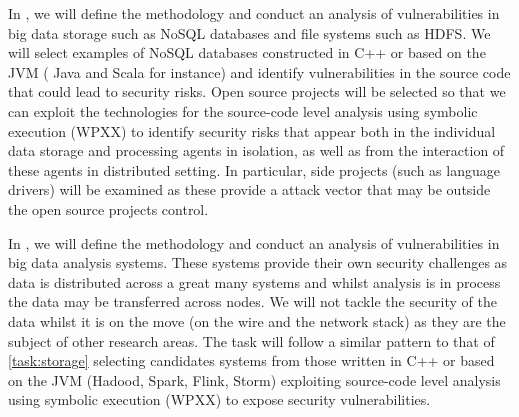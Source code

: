 \begin{Workpackage}{\thewpno}
\begin{Task}

\TaskResults{%
}
\TaskHeader{}
In \theTask, we will define the methodology and conduct an analysis of vulnerabilities in big data storage such as NoSQL databases and file systems such as HDFS.  We will select examples of  NoSQL databases constructed in C++ or  based on the JVM ( Java and Scala for instance) and identify vulnerabilities in the source code that could lead to security risks. Open source projects will be selected so that we can exploit the technologies for the source-code level analysis using symbolic execution (WPXX) to identify security risks that appear both in the individual data storage and processing agents in isolation, as well as from the interaction of these agents in distributed setting. In particular, side projects (such as language drivers) will be examined as these provide a attack vector that may be outside the open source projects control. 
 \end{Task}

 \begin{Task}
 
 \TaskResults{%
 }
 \TaskHeader{}
 In \theTask, we will define the methodology and conduct an analysis of vulnerabilities in big data analysis systems.  These systems provide their own security challenges as data is distributed across a great many systems and whilst analysis is in process the data may be transferred across nodes.  We will not tackle the security of the data whilst it is on the move (on the wire and the network stack) as they are the subject of other research areas.  The task will follow a similar pattern to that of \ref{task:storage} selecting candidates systems from those written in C++ or based on the JVM (Hadood, Spark, Flink, Storm) exploiting source-code level analysis using symbolic execution (WPXX) to expose security vulnerabilities.
\end{Task}
 
\begin{Task}
  

\end{Task}
\end{Workpackage}
